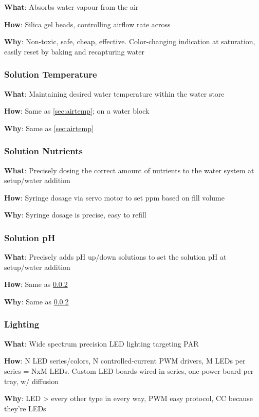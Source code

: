 \documentclass{report}
\begin{document}
\textbf{What}: Absorbs water vapour from the air

\textbf{How}: Silica gel beads, controlling airflow rate across

\textbf{Why}: Non-toxic, safe, cheap, effective. Color-changing indication at saturation, easily reset by baking and recapturing water

\subsubsection{Solution Temperature}
\label{sec:watertemp}

\textbf{What}: Maintaining desired water temperature within the water store

\textbf{How}: Same as \ref{sec:airtemp}; on a water block

\textbf{Why}: Same as \ref{sec:airtemp}

\newpage

\subsubsection{Solution Nutrients}
\label{sec:nutrients}

\textbf{What}: Precisely dosing the correct amount of nutrients to the water system at setup/water addition

\textbf{How}: Syringe dosage via servo motor to set ppm based on fill volume

\textbf{Why}: Syringe dosage is precise, easy to refill

\subsubsection{Solution pH}
\label{sec:ph}

\textbf{What}: Precisely adds pH up/down solutions to set the solution pH at setup/water addition

\textbf{How}: Same as \ref{sec:nutrients}

\textbf{Why}: Same as \ref{sec:nutrients}

\subsubsection{Lighting}
\label{sec:lighting}

\textbf{What}: Wide spectrum precision LED lighting targeting PAR

\textbf{How}: N LED series/colors, N controlled-current PWM drivers, M LEDs per series = NxM LEDs. Custom LED boards wired in series, one power board per tray, w/ diffusion

\textbf{Why}: LED > every other type in every way, PWM easy protocol, CC because they’re LEDs




% 
% 
\end{document}
